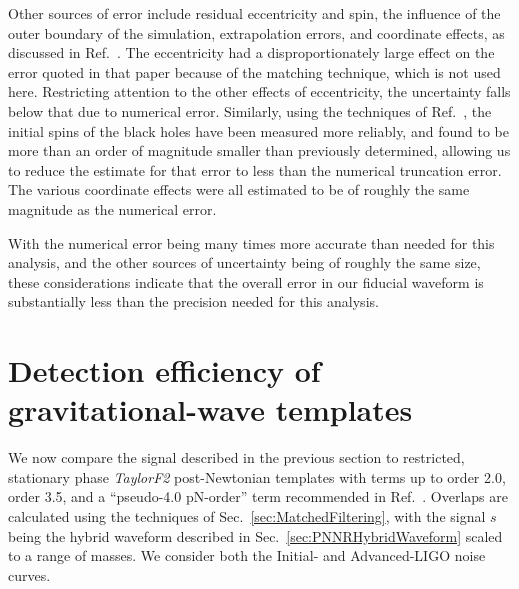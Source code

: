 Other sources of error include residual eccentricity and spin, the
influence of the outer boundary of the simulation, extrapolation
errors, and coordinate effects, as discussed in Ref.~\cite{Boyle2007}.
The eccentricity had a disproportionately large effect on the error
quoted in that paper because of the matching technique, which is not
used here.  Restricting attention to the other effects of
eccentricity, the uncertainty falls below that due to numerical error.
Similarly, using the techniques of Ref.~\cite{Lovelace2008}, the
initial spins of the black holes have been measured more reliably, and
found to be more than an order of magnitude smaller than previously
determined, allowing us to reduce the estimate for that error to less
than the numerical truncation error.  The various coordinate effects
were all estimated to be of roughly the same magnitude as the
numerical error.

With the numerical error being many times more accurate than needed
for this analysis, and the other sources of uncertainty being of
roughly the same size, these considerations indicate that the overall
error in our fiducial waveform is substantially less than the
precision needed for this analysis.


\section{Detection efficiency of gravitational-wave templates}
\label{sec:Efficiency} %

We now compare the signal described in the previous section to
restricted, stationary phase \textit{TaylorF2} post-Newtonian
templates with terms up to order 2.0, order 3.5, and a ``pseudo-4.0
pN-order'' term recommended in Ref.~\cite{Pan2007}.  Overlaps are
calculated using the techniques of Sec.~\ref{sec:MatchedFiltering},
with the signal $s$ being the hybrid waveform described in
Sec.~\ref{sec:PNNRHybridWaveform} scaled to a range of masses.  We
consider both the Initial- and Advanced-LIGO noise curves.

